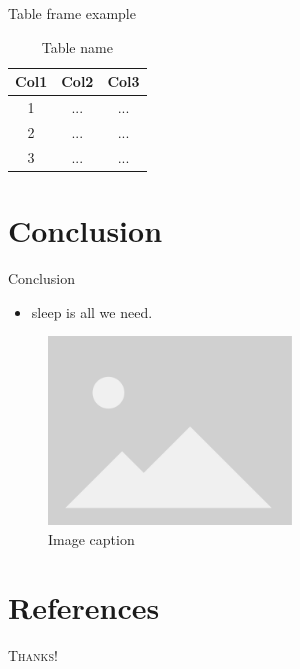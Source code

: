 \documentclass{beamer}
\begin{document}
\begin{frame}{Table frame example}

\begin{table}
    \begin{tabular}{c|cc}
        \textbf{Col1} & Col2 & Col3 \\
        \hline
        1            & ...                    & ...             \\
        2            & ...                    & ...             \\
        3            & ...                    & ...             \\
    \end{tabular}
    \caption{Table name}
    \label{tab:table1}
\end{table}

\end{frame}

\section{Conclusion}

\begin{frame}{Conclusion}
    \begin{itemize}
        \item sleep is all we need.
    \end{itemize}
    \begin{figure}
        \centering
        \includegraphics[height=5cm]{images/placeholder_image.png}
        \caption{Image caption}
        \label{fig:figure2}
    \end{figure}
\end{frame}


\section{References}

\begin{frame}[allowframebreaks] %
    
    \tiny
\end{frame}

\begin{frame}
    \begin{center}
        \Huge \textsc{Thanks!}
    \end{center}
\end{frame}
\end{document}
